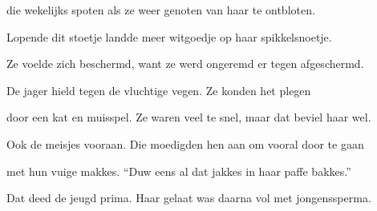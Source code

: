 die wekelijks spoten
als ze weer genoten
van haar te ontbloten.

Lopende dit stoetje
landde meer witgoedje
op haar spikkelsnoetje.

Ze voelde zich beschermd,
want ze werd ongeremd
er tegen afgeschermd.

De jager hield tegen
de vluchtige vegen.
Ze konden het plegen

door een kat en muisspel.
Ze waren veel te snel,
maar dat beviel haar wel.

Ook de meisjes vooraan.
Die moedigden hen aan
om vooral door te gaan

met hun vuige makkes.
“Duw eens al dat jakkes
in haar paffe bakkes.”

Dat deed de jeugd prima.
Haar gelaat was daarna
vol met jongenssperma.

